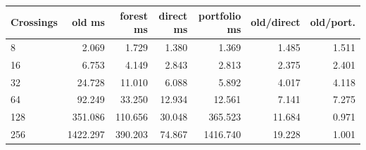 \begin{center}\small
\begin{tabular}{@{}lrrrrrr@{}}
\toprule
Crossings & old ms & forest ms & direct ms & portfolio ms & old/direct & old/port. \\
\midrule
8 & 2.069 & 1.729 & 1.380 & 1.369 & 1.485 & 1.511 \\
16 & 6.753 & 4.149 & 2.843 & 2.813 & 2.375 & 2.401 \\
32 & 24.728 & 11.010 & 6.088 & 5.892 & 4.017 & 4.118 \\
64 & 92.249 & 33.250 & 12.934 & 12.561 & 7.141 & 7.275 \\
128 & 351.086 & 110.656 & 30.048 & 365.523 & 11.684 & 0.971 \\
256 & 1422.297 & 390.203 & 74.867 & 1416.740 & 19.228 & 1.001 \\
\bottomrule
\end{tabular}
\end{center}
